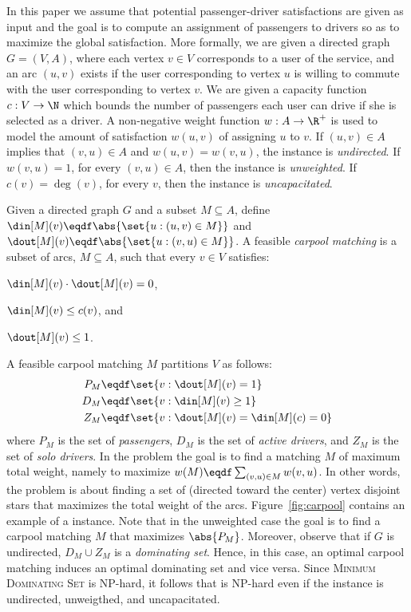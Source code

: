In this paper we assume that potential passenger-driver satisfactions
are given as input and the goal is to compute an assignment of
passengers to drivers so as to maximize the global satisfaction.
%
More formally, we are given a directed graph $G = (V, A)$, where each
vertex $v \in V$ corresponds to a user of the service, and an arc $(u,
v)$ exists if the user corresponding to vertex $u$ is willing to
commute with the user corresponding to vertex $v$.  We are given a
capacity function $c: V \rightarrow \N$ which bounds the number of
passengers each user can drive if she is selected as a driver.  A
non-negative weight function $w : A \rightarrow \R^+$ is used to model
the amount of satisfaction $w(u,v)$ of assigning $u$ to $v$.
%
If $(u,v) \in A$ implies that $(v,u) \in A$ and $w(u,v) = w(v,u)$, the
instance is \emph{undirected}.  If $w(v,u) = 1$, for every $(v,u) \in
A$, then the instance is \emph{unweighted}.  If $c(v) = \deg(v)$, for
every $v$, then the instance is \emph{uncapacitated}.

Given a directed graph $G$ and a subset $M \subseteq A$, define
\(
\din[M](v) \eqdf \abs{\set{u :(u,v) \in M}}
\)
and
\(
\dout[M](v) \eqdf \abs{\set{u :(v,u) \in M}}
\).
%
A feasible \emph{carpool matching} is a subset of arcs, $M \subseteq
A$, such that every $v \in V$ satisfies:%
\begin{inparaenum}[(i)]
\item $\din[M](v) \cdot \dout[M](v) = 0$,
\item $\din[M](v) \leq c(v)$, and 
\item $\dout[M](v) \leq 1$.
\end{inparaenum}
A feasible carpool matching $M$ partitions $V$ as follows:
\begin{align*}
P_M & \eqdf \set{v : \dout[M](v) = 1} \\
D_M & \eqdf \set{v : \din[M](v) \geq 1} \\
Z_M & \eqdf \set{v : \dout[M](v) = \din[M](c) = 0}
\end{align*}
where $P_M$ is the set of \emph{passengers}, $D_M$ is the set of
\emph{active drivers}, and $Z_M$ is the set of \emph{solo drivers}.
%
In the \carpool problem the goal is to find a matching $M$ of maximum
total weight, namely to maximize $w(M) \eqdf \sum_{(v,u) \in M}
w(v,u)$.  In other words, the \carpool problem is about finding a set
of (directed toward the center) vertex disjoint stars that maximizes
the total weight of the arcs.  
%
Figure~\ref{fig:carpool} contains an example of a \carpool instance.
%
Note that in the unweighted case the goal is to find a carpool
matching $M$ that maximizes $\abs{P_M}$.
%
Moreover, observe that if $G$ is undirected, $D_M \cup Z_M$ is
a \emph{dominating set}.  Hence, in this case, an optimal carpool
matching induces an optimal dominating set and vice versa.
Since \textsc{Minimum Dominating Set} is NP-hard, it follows
that \carpool is NP-hard even if the instance is undirected,
unweigthed, and uncapacitated.

